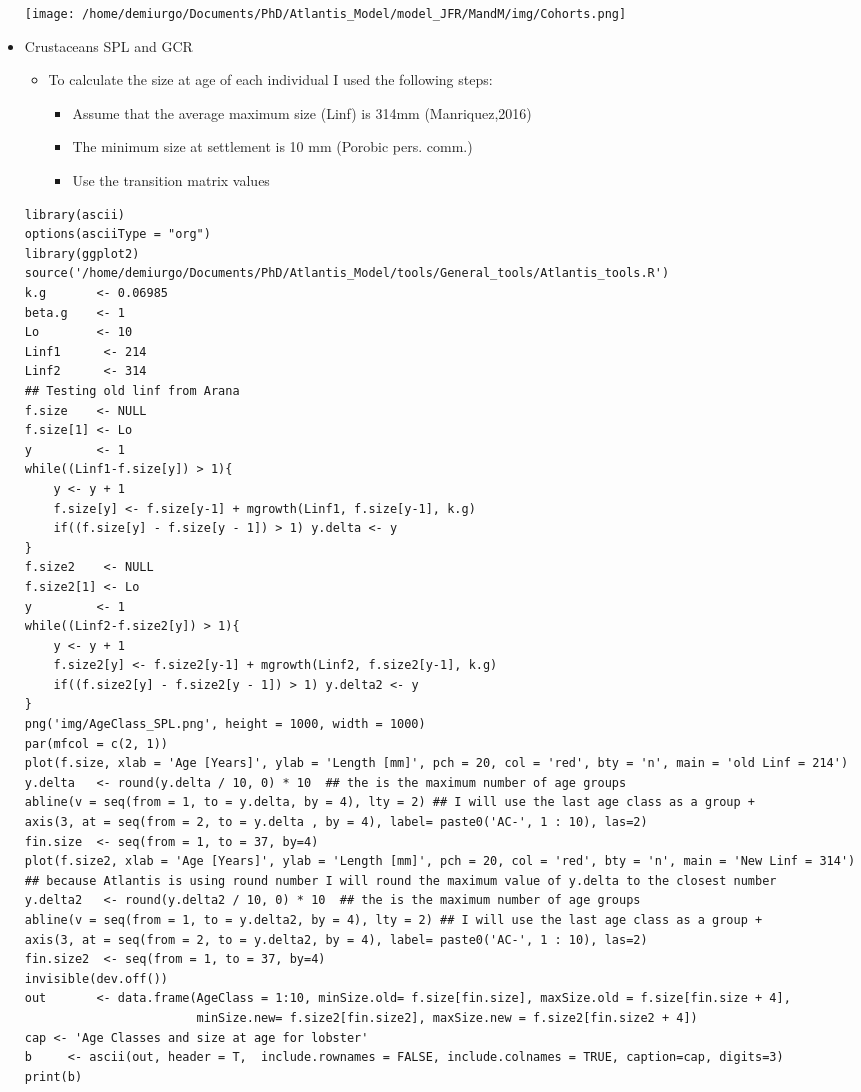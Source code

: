 \documentclass[11pt]{article}
\begin{document}
\begin{itemize}
\texttt{[image: /home/demiurgo/Documents/PhD/Atlantis\_Model/model\_JFR/MandM/img/Cohorts.png]}


\item Crustaceans SPL and GCR
\label{sec-5-2-1-11-2}%
\begin{itemize}
\item To calculate the size at age of each individual I used the following steps:
\begin{itemize}
\item Assume that the average maximum size (Linf) is 314mm (Manriquez,2016)
\item The minimum size at settlement is 10 mm (Porobic pers. comm.)
\item Use the transition matrix values
\end{itemize}
\end{itemize}

\begin{verbatim}
library(ascii)
options(asciiType = "org")
library(ggplot2)
source('/home/demiurgo/Documents/PhD/Atlantis_Model/tools/General_tools/Atlantis_tools.R')
k.g       <- 0.06985
beta.g    <- 1
Lo        <- 10
Linf1      <- 214
Linf2      <- 314
## Testing old linf from Arana
f.size    <- NULL
f.size[1] <- Lo
y         <- 1
while((Linf1-f.size[y]) > 1){
    y <- y + 1
    f.size[y] <- f.size[y-1] + mgrowth(Linf1, f.size[y-1], k.g)
    if((f.size[y] - f.size[y - 1]) > 1) y.delta <- y
}
f.size2    <- NULL
f.size2[1] <- Lo
y         <- 1
while((Linf2-f.size2[y]) > 1){
    y <- y + 1
    f.size2[y] <- f.size2[y-1] + mgrowth(Linf2, f.size2[y-1], k.g)
    if((f.size2[y] - f.size2[y - 1]) > 1) y.delta2 <- y
}
png('img/AgeClass_SPL.png', height = 1000, width = 1000)
par(mfcol = c(2, 1))
plot(f.size, xlab = 'Age [Years]', ylab = 'Length [mm]', pch = 20, col = 'red', bty = 'n', main = 'old Linf = 214')
y.delta   <- round(y.delta / 10, 0) * 10  ## the is the maximum number of age groups
abline(v = seq(from = 1, to = y.delta, by = 4), lty = 2) ## I will use the last age class as a group +
axis(3, at = seq(from = 2, to = y.delta , by = 4), label= paste0('AC-', 1 : 10), las=2)
fin.size  <- seq(from = 1, to = 37, by=4)
plot(f.size2, xlab = 'Age [Years]', ylab = 'Length [mm]', pch = 20, col = 'red', bty = 'n', main = 'New Linf = 314')
## because Atlantis is using round number I will round the maximum value of y.delta to the closest number
y.delta2   <- round(y.delta2 / 10, 0) * 10  ## the is the maximum number of age groups
abline(v = seq(from = 1, to = y.delta2, by = 4), lty = 2) ## I will use the last age class as a group +
axis(3, at = seq(from = 2, to = y.delta2, by = 4), label= paste0('AC-', 1 : 10), las=2)
fin.size2  <- seq(from = 1, to = 37, by=4)
invisible(dev.off())
out       <- data.frame(AgeClass = 1:10, minSize.old= f.size[fin.size], maxSize.old = f.size[fin.size + 4],
                        minSize.new= f.size2[fin.size2], maxSize.new = f.size2[fin.size2 + 4])
cap <- 'Age Classes and size at age for lobster'
b     <- ascii(out, header = T,  include.rownames = FALSE, include.colnames = TRUE, caption=cap, digits=3)
print(b)
\end{verbatim}


\end{itemize}
\end{document}
